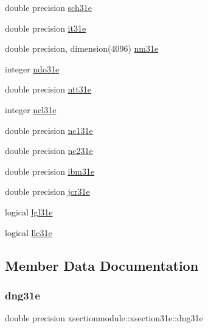 \begin{DoxyCompactItemize}
\item 
double precision \hyperlink{structxsectionmodule_1_1xsection31e_a5f54e6514f7b9e5ab2df3327e103b287}{sch31e}
\item 
double precision \hyperlink{structxsectionmodule_1_1xsection31e_a83eb5e4f3097c911fa022141fb4a0683}{it31e}
\item 
double precision, dimension(4096) \hyperlink{structxsectionmodule_1_1xsection31e_abc35186adf9ab920ee7c3dd70a9ab418}{nm31e}
\item 
integer \hyperlink{structxsectionmodule_1_1xsection31e_aaf18fb37b6ffcd90edefbd443b246aae}{ndo31e}
\item 
double precision \hyperlink{structxsectionmodule_1_1xsection31e_a1a227e343f002fc8bf79d9e19c6759c7}{ntt31e}
\item 
integer \hyperlink{structxsectionmodule_1_1xsection31e_ae07c07e2301d473c6549d7a0ce35846b}{ncl31e}
\item 
double precision \hyperlink{structxsectionmodule_1_1xsection31e_a6b5621ea8a2775b13a12b3503549ddaa}{nc131e}
\item 
double precision \hyperlink{structxsectionmodule_1_1xsection31e_a4e5964c3779def3b84a27565edd1d05c}{nc231e}
\item 
double precision \hyperlink{structxsectionmodule_1_1xsection31e_a4332b1da50baa2b244bcc626a7aabf4c}{ibm31e}
\item 
double precision \hyperlink{structxsectionmodule_1_1xsection31e_a9dcced3b8c2c1822f97e54282726576f}{jcr31e}
\item 
logical \hyperlink{structxsectionmodule_1_1xsection31e_a0787ec91e9ad7d5176e99e65765e108b}{lgl31e}
\item 
logical \hyperlink{structxsectionmodule_1_1xsection31e_a701676cabd4d1bd5c21886fef0d34980}{llc31e}
\end{DoxyCompactItemize}


\subsection{Member Data Documentation}
\mbox{\label{structxsectionmodule_1_1xsection31e_a6dfbffef044283f1431667502027bb42}} 
\subsubsection{\texorpdfstring{dng31e}{dng31e}}
{\footnotesize\ttfamily double precision xsectionmodule\+::xsection31e\+::dng31e}

